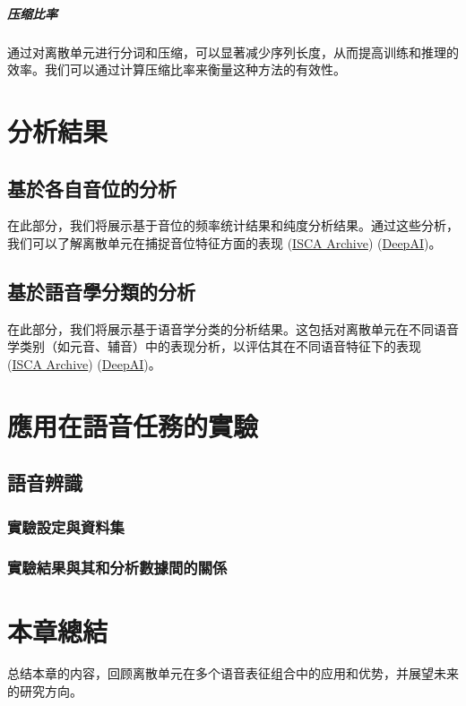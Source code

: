 \subparagraph{压缩比率}

通过对离散单元进行分词和压缩，可以显著减少序列长度，从而提高训练和推理的效率。我们可以通过计算压缩比率来衡量这种方法的有效性。

 


\section{分析結果}


\subsection{基於各自音位的分析}

在此部分，我们将展示基于音位的频率统计结果和纯度分析结果。通过这些分析，我们可以了解离散单元在捕捉音位特征方面的表现 (\href{https://www.isca-archive.org/interspeech_2022/ren22_interspeech.html}{ISCA Archive}) (\href{https://deepai.org/publication/speech-pre-training-with-acoustic-piece}{DeepAI})。

\subsection{基於語音學分類的分析}


在此部分，我们将展示基于语音学分类的分析结果。这包括对离散单元在不同语音学类别（如元音、辅音）中的表现分析，以评估其在不同语音特征下的表现 (\href{https://www.isca-archive.org/interspeech_2022/ren22_interspeech.html}{ISCA Archive}) (\href{https://deepai.org/publication/speech-pre-training-with-acoustic-piece}{DeepAI})。



 
\section{應用在語音任務的實驗}

\subsection{語音辨識}

\subsubsection{實驗設定與資料集}

\subsubsection{實驗結果與其和分析數據間的關係}



\section{本章總結}

总结本章的内容，回顾离散单元在多个语音表征组合中的应用和优势，并展望未来的研究方向。
